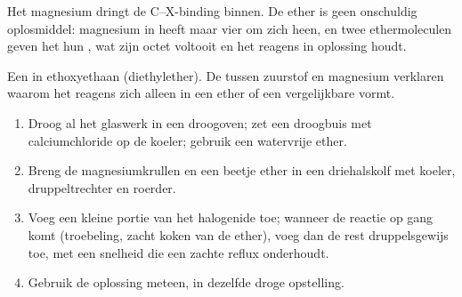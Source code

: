 Het magnesium dringt de C--X-binding binnen. De ether is geen onschuldig
oplosmiddel: magnesium in  heeft maar vier  om
zich heen, en twee ethermoleculen geven het hun , wat zijn
octet voltooit en het reagens in oplossing houdt.

\begin{omfigure}

{\small Een  in ethoxyethaan (diethylether). De  tussen zuurstof en magnesium verklaren waarom het reagens zich
alleen in een ether of een vergelijkbare  vormt.}
\end{omfigure}

\begin{method}\label{met:b1:organomagnesium:prepare}
\begin{enumerate}
  \item Droog al het glaswerk in een droogoven; zet een droogbuis met
        calciumchloride op de koeler; gebruik een watervrije ether.
  \item Breng de magnesiumkrullen en een beetje ether in een driehalskolf
        met koeler, druppeltrechter en roerder.
  \item Voeg een kleine portie van het halogenide toe; wanneer de reactie
        op gang komt (troebeling, zacht koken van de ether), voeg dan de
        rest druppelsgewijs toe, met een snelheid die een zachte reflux
        onderhoudt.
  \item Gebruik de oplossing meteen, in dezelfde droge opstelling.
\end{enumerate}
\end{method}

